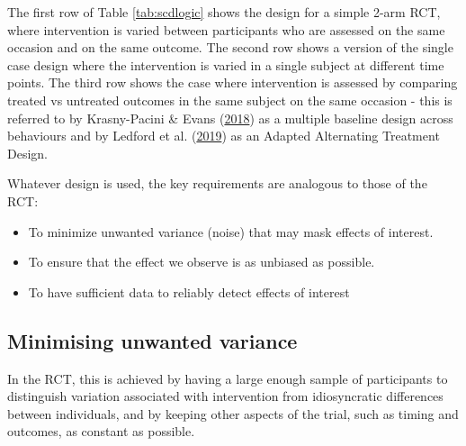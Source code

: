 \documentclass{krantz}
\providecommand{\tightlist}{%
\setlength{\itemsep}{0pt}\setlength{\parskip}{0pt}}
\begin{document}
The first row of Table \ref{tab:scdlogic} shows the design for a simple 2-arm RCT, where intervention is varied between participants who are assessed on the same occasion and on the same outcome. The second row shows a version of the single case design where the intervention is varied in a single subject at different time points. The third row shows the case where intervention is assessed by comparing treated vs untreated outcomes in the same subject on the same occasion - this is referred to by Krasny-Pacini \& Evans (\protect\hyperlink{ref-krasny-pacini2018}{2018}) as a multiple baseline design across behaviours and by Ledford et al. (\protect\hyperlink{ref-ledford2019}{2019}) as an Adapted Alternating Treatment Design.

Whatever design is used, the key requirements are analogous to those of the RCT:

\begin{itemize}
\tightlist
\item
  To minimize unwanted variance (noise) that may mask effects of interest.
\item
  To ensure that the effect we observe is as unbiased as possible.
\item
  To have sufficient data to reliably detect effects of interest
\end{itemize}

\hypertarget{minimising-unwanted-variance}{%
\subsection{Minimising unwanted variance}\label{minimising-unwanted-variance}}

In the RCT, this is achieved by having a large enough sample of participants to distinguish variation associated with intervention from idiosyncratic differences between individuals, and by keeping other aspects of the trial, such as timing and outcomes, as constant as possible.
\end{document}
